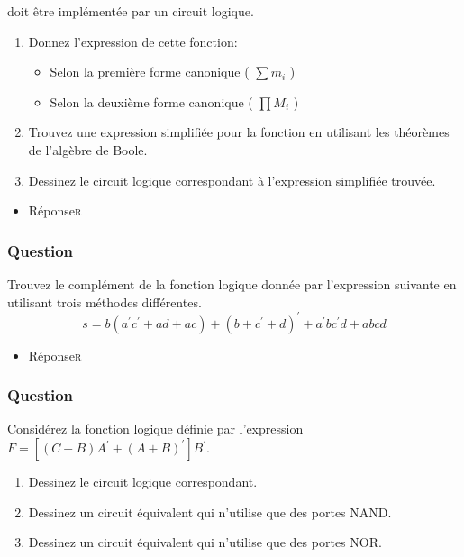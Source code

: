 \documentclass[11pt]{article}
\begin{document}
doit être implémentée par un circuit logique.

\begin{enumerate}
\item Donnez l'expression de cette fonction:

\begin{itemize}
\item Selon la première forme canonique ( \(\sum m_i\) )

\item Selon la deuxième forme canonique ( \(\prod M_i\) )
\end{itemize}

\item Trouvez une expression simplifiée pour la fonction en utilisant
les théorèmes de l'algèbre de Boole.

\item Dessinez le circuit logique correspondant à l'expression
simplifiée trouvée.
\end{enumerate}

\begin{itemize}
\item Réponse\hfill{}\textsc{r}
\label{sec:orgc93ab4c}
\end{itemize}

\subsubsection*{Question}
\label{sec:org2a6f7f1}
Trouvez le complément de la fonction logique donnée par l'expression
   suivante en utilisant trois méthodes différentes.
   $$
    s = b (a^{\prime} c^{\prime} + a d + a c) + (b + c^{\prime}+
      d)^{\prime} + a^{\prime} b c^{\prime} d + a b c d
    $$

\begin{itemize}
\item Réponse\hfill{}\textsc{r}
\label{sec:org9dd6a2b}
\end{itemize}

\subsubsection*{Question}
\label{sec:orgbd94594}
Considérez la fonction logique définie par l'expression \(F =
      [ (C + B) A^{\prime} + (A+B)^{\prime} ] B^{\prime}\).

\begin{enumerate}
\item Dessinez le circuit logique correspondant.

\item Dessinez un circuit équivalent qui n'utilise que des portes
NAND.

\item Dessinez un circuit équivalent qui n'utilise que des portes
NOR.
\end{enumerate}
\end{document}
